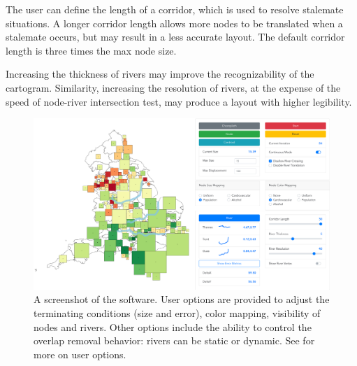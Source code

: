  The user can define the length of a corridor, which is used to resolve stalemate situations. A longer corridor length allows more nodes to be translated when a stalemate occurs, but may result in a less accurate layout. The default corridor length is three times the max node size.

 Increasing the thickness of rivers may improve the recognizability of the cartogram. Similarity, increasing the resolution of rivers, at the expense of the speed of node-river intersection test, may produce a layout with higher legibility.

 

{
\begin{figure}[tb!]
    \centering
    \includegraphics[width=\textwidth,keepaspectratio]{figure/UI.png}
    \caption{A screenshot of the software. User options are provided to adjust the terminating conditions (size and error), color mapping, visibility of nodes and rivers. Other options include the ability to control the overlap removal behavior: rivers can be static or dynamic. See  for more on user options. }
    \label{fig:overview}
\end{figure}
}